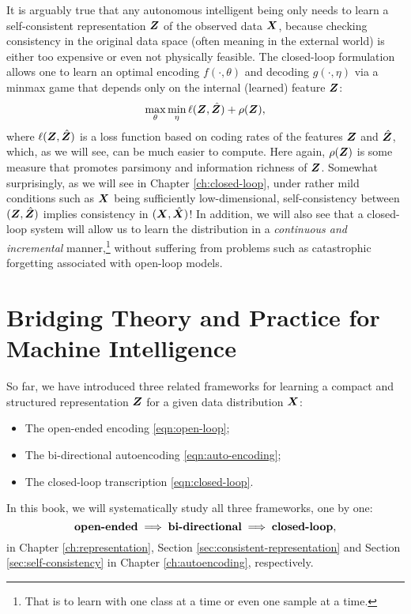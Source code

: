 \documentclass[../../book-main.tex]{subfiles}
\begin{document}
It is arguably true that any  autonomous intelligent being only needs to learn a self-consistent representation $\bm{Z}$ of the observed data $\bm{X}$, because checking consistency in the original data space (often meaning in the external world) is either too expensive or even not physically feasible. The closed-loop formulation allows one to learn an optimal encoding $f(\cdot, \theta)$ and decoding $g(\cdot, \eta)$ via a minmax game that depends only on the internal (learned) feature $\bm{Z}$:
\begin{equation}
\max_{\theta}\min_{\eta} \ell( \bm{Z}, \hat {\bm{Z}}) + \rho(\bm{Z}), 
   \label{eqn:closed-loop-objective}
\end{equation}
where $\ell( \bm{Z}, \hat {\bm{Z}})$ is a loss function based on coding rates of the features $\bm{Z}$ and $\hat {\bm{Z}}$, which, as we will see, can be much easier to compute. Here again, $\rho(\bm{Z})$ is some measure that promotes parsimony and information richness of $\bm{Z}$. Somewhat surprisingly, as we will see in Chapter \ref{ch:closed-loop}, under rather mild conditions such as $\bm{X}$ being sufficiently low-dimensional, self-consistency between $(\bm{Z}, \hat {\bm{Z}})$ implies consistency in $(\bm{X}, \hat {\bm{X}})$! In addition, we will also see that a closed-loop system will allow us to learn the distribution in a {\em continuous and incremental} manner,\footnote{That is to learn with one class at a time or even one sample at a time.} without suffering from problems such as catastrophic forgetting associated with open-loop models. 

\section{Bridging Theory and Practice for Machine Intelligence}
So far, we have introduced three related  frameworks for learning a compact and structured representation $\bm{Z}$ for a given data distribution $\bm{X}$: 
\begin{itemize}
\item The open-ended encoding \eqref{eqn:open-loop};
\item The bi-directional autoencoding \eqref{eqn:auto-encoding};
\item The closed-loop transcription \eqref{eqn:closed-loop}.
\end{itemize}
In this book, we will systematically study all three frameworks, one by one:
\begin{equation}
    \mbox{\textbf{open-ended}} \; \Longrightarrow \; 
    \mbox{\textbf{bi-directional}} \;  \Longrightarrow \; \mbox{\textbf{closed-loop}},
\end{equation}
in Chapter \ref{ch:representation}, Section \ref{sec:consistent-representation} and Section \ref{sec:self-consistency} in Chapter \ref{ch:autoencoding}, respectively.
\end{document}
